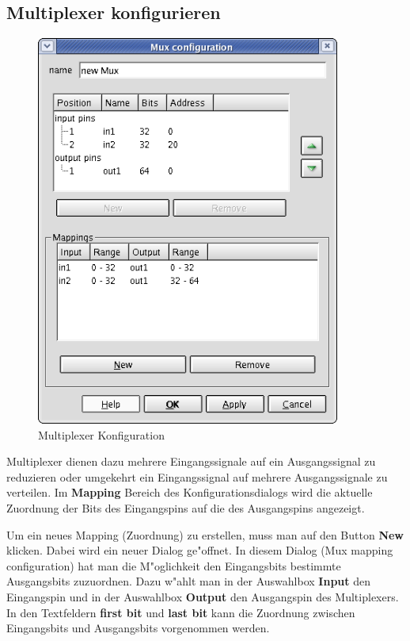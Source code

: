 \documentclass[a4paper,titlepage,12pt,ngerman]{scrbook}
\begin{document}
\subsection{Multiplexer konfigurieren}
\begin{figure}[htbp]

\begin{center}

\includegraphics[width=10cm]{MuxConfiguration}

\caption{Multiplexer Konfiguration}\label{test}

\end{center}

\end{figure}

Multiplexer dienen dazu mehrere Eingangssignale auf ein Ausgangssignal zu reduzieren oder umgekehrt ein  Eingangssignal auf mehrere Ausgangssignale zu verteilen.
Im {\bf Mapping} Bereich des Konfigurationsdialogs wird die aktuelle Zuordnung der Bits des Eingangspins auf die des Ausgangspins angezeigt.\par
Um ein neues Mapping (Zuordnung) zu erstellen, muss man auf den Button {\bf New} klicken. Dabei wird ein neuer Dialog ge"offnet. In diesem Dialog (Mux mapping configuration) hat man die M"oglichkeit den Eingangsbits bestimmte Ausgangsbits zuzuordnen. Dazu w"ahlt man in der Auswahlbox {\bf Input} den Eingangspin und in der Auswahlbox {\bf Output} den Ausgangspin des Multiplexers. In den Textfeldern {\bf first bit} und {\bf last bit} kann die Zuordnung zwischen Eingangsbits und Ausgangsbits vorgenommen werden.\par
\end{document}
